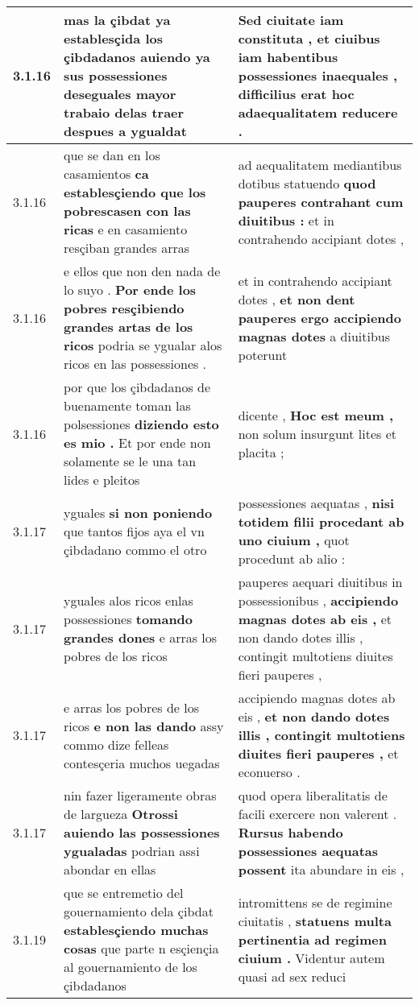 \begin{tabular}{|p{1cm}|p{6.5cm}|p{6.5cm}|}
3.1.16 & mas la çibdat ya establesçida los çibdadanos \textbf{ auiendo ya sus possessiones } deseguales mayor trabaio delas traer despues a ygualdat & Sed ciuitate iam constituta , \textbf{ et ciuibus iam habentibus possessiones inaequales , } difficilius erat hoc adaequalitatem reducere . \\\hline
3.1.16 & que se dan en los casamientos \textbf{ ca establesçiendo que los pobrescasen con las ricas } e en casamiento resçiban grandes arras & ad aequalitatem mediantibus dotibus statuendo \textbf{ quod pauperes contrahant cum diuitibus : } et in contrahendo accipiant dotes , \\\hline
3.1.16 & e ellos que non den nada de lo suyo . \textbf{ Por ende los pobres resçibiendo grandes artas de los ricos } podria se ygualar alos ricos en las possessiones . & et in contrahendo accipiant dotes , \textbf{ et non dent pauperes ergo accipiendo magnas dotes } a diuitibus poterunt \\\hline
3.1.16 & por que los çibdadanos de buenamente toman las polsessiones \textbf{ diziendo esto es mio . } Et por ende non solamente se le una tan lides e pleitos & dicente , \textbf{ Hoc est meum , } non solum insurgunt lites et placita ; \\\hline
3.1.17 & yguales \textbf{ si non poniendo } que tantos fijos aya el vn çibdadano commo el otro & possessiones aequatas , \textbf{ nisi totidem filii procedant ab uno ciuium , } quot procedunt ab alio : \\\hline
3.1.17 & yguales alos ricos enlas possessiones \textbf{ tomando grandes dones } e arras los pobres de los ricos & pauperes aequari diuitibus in possessionibus , \textbf{ accipiendo magnas dotes ab eis , } et non dando dotes illis , contingit multotiens diuites fieri pauperes , \\\hline
3.1.17 & e arras los pobres de los ricos \textbf{ e non las dando } assy commo dize felleas contesçeria muchos uegadas & accipiendo magnas dotes ab eis , \textbf{ et non dando dotes illis , contingit multotiens diuites fieri pauperes , } et econuerso . \\\hline
3.1.17 & nin fazer ligeramente obras de largueza \textbf{ Otrossi auiendo las possessiones ygualadas } podrian assi abondar en ellas & quod opera liberalitatis de facili exercere non valerent . \textbf{ Rursus habendo possessiones aequatas possent } ita abundare in eis , \\\hline
3.1.19 & que se entremetio del gouernamiento dela çibdat \textbf{ establesçiendo muchas cosas } que parte n esçiençia al gouernamiento de los çibdadanos & intromittens se de regimine ciuitatis , \textbf{ statuens multa pertinentia ad regimen ciuium . } Videntur autem quasi ad sex reduci \\\hline

\end{tabular}

